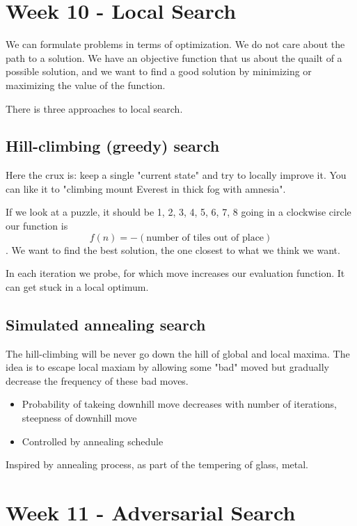 \documentclass{article}
\begin{document}
\newpage
\section{Week 10 - Local Search}
We can formulate problems in terms of optimization. We do not care about the
path to a solution. We have an objective function that us about the quailt of a
possible solution, and we want to find a good solution by minimizing or
maximizing the value of the function.

There is three approaches to local search.

\subsection{Hill-climbing (greedy) search}
Here the crux is: keep a single "current state" and try to locally improve it.
You can like it to "climbing mount Everest in thick fog with amnesia".

If we look at a puzzle, it should be 1, 2, 3, 4, 5, 6, 7, 8 going in a clockwise
circle our function is $$f(n) = -(\text{number of tiles out of place})$$.
We want to find the best solution, the one closest to what we think we want.

In each iteration we probe, for which move increases our evaluation function.
It can get stuck in a local optimum.

\subsection{Simulated annealing search}
The hill-climbing will be never go down the hill of global and local maxima. 
The idea is to escape local maxiam by allowing some "bad" moved but gradually
decrease the frequency of these bad moves.
\begin{itemize}
  \item Probability of takeing downhill move decreases with number of
    iterations, steepness of downhill move
  \item Controlled by annealing schedule 
\end{itemize}
Inspired by annealing process, as part of the tempering of glass, metal.



\newpage
\section{Week 11 - Adversarial Search}%
\label{sub:_adversarial_search}
\end{document}
